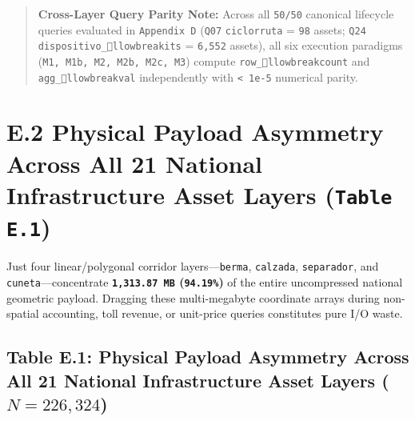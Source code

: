 \documentclass[10pt,a4paper]{article}
\begin{document}
\begin{quote}\small \textbf{Cross-Layer Query Parity Note:} Across all \texttt{50/50} canonical lifecycle queries evaluated in \texttt{Appendix D} (\texttt{Q07} \texttt{ciclorruta} = \texttt{98} assets; \texttt{Q24} \texttt{dispositivo\_llowbreak{}its} = \texttt{6,552} assets), all six execution paradigms (\texttt{M1, M1b, M2, M2b, M2c, M3}) compute \texttt{row\_llowbreak{}count} and \texttt{agg\_llowbreak{}val} independently with \texttt{< 1e-5} numerical parity.\end{quote}



\section*{E.2 Physical Payload Asymmetry Across All 21 National Infrastructure Asset Layers (\texttt{Table E.1})}

Just four linear/polygonal corridor layers---\texttt{berma}, \texttt{calzada}, \texttt{separador}, and \texttt{cuneta}---concentrate \textbf{\texttt{1,313.87 MB} (\texttt{94.19\%})} of the entire uncompressed national geometric payload. Dragging these multi-megabyte coordinate arrays during non-spatial accounting, toll revenue, or unit-price queries constitutes pure I/O waste.

\subsection*{Table E.1: Physical Payload Asymmetry Across All 21 National Infrastructure Asset Layers ($N = 226,324$)}
\end{document}
